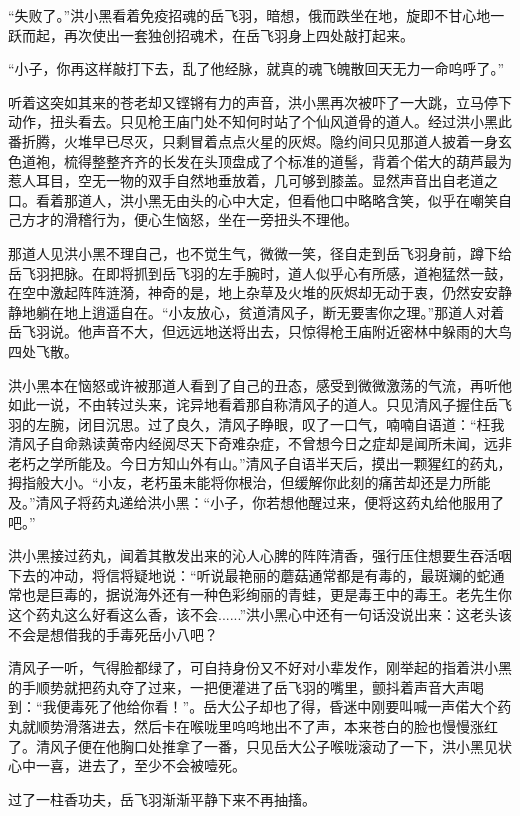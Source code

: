 “失败了。”洪小黑看着免疫招魂的岳飞羽，暗想，俄而跌坐在地，旋即不甘心地一跃而起，再次使出一套独创招魂术，在岳飞羽身上四处敲打起来。

“小子，你再这样敲打下去，乱了他经脉，就真的魂飞魄散回天无力一命呜呼了。”

听着这突如其来的苍老却又铿锵有力的声音，洪小黑再次被吓了一大跳，立马停下动作，扭头看去。只见枪王庙门处不知何时站了个仙风道骨的道人。经过洪小黑此番折腾，火堆早已尽灭，只剩冒着点点火星的灰烬。隐约间只见那道人披着一身玄色道袍，梳得整整齐齐的长发在头顶盘成了个标准的道髻，背着个偌大的葫芦最为惹人耳目，空无一物的双手自然地垂放着，几可够到膝盖。显然声音出自老道之口。看着那道人，洪小黑无由头的心中大定，但看他口中略略含笑，似乎在嘲笑自己方才的滑稽行为，便心生恼怒，坐在一旁扭头不理他。

那道人见洪小黑不理自己，也不觉生气，微微一笑，径自走到岳飞羽身前，蹲下给岳飞羽把脉。在即将抓到岳飞羽的左手腕时，道人似乎心有所感，道袍猛然一鼓，在空中激起阵阵涟漪，神奇的是，地上杂草及火堆的灰烬却无动于衷，仍然安安静静地躺在地上逍遥自在。“小友放心，贫道清风子，断无要害你之理。”那道人对着岳飞羽说。他声音不大，但远远地送将出去，只惊得枪王庙附近密林中躲雨的大鸟四处飞散。

洪小黑本在恼怒或许被那道人看到了自己的丑态，感受到微微激荡的气流，再听他如此一说，不由转过头来，诧异地看着那自称清风子的道人。只见清风子握住岳飞羽的左腕，闭目沉思。过了良久，清风子睁眼，叹了一口气，喃喃自语道：“枉我清风子自命熟读黄帝内经阅尽天下奇难杂症，不曾想今日之症却是闻所未闻，远非老朽之学所能及。今日方知山外有山。”清风子自语半天后，摸出一颗猩红的药丸，拇指般大小。“小友，老朽虽未能将你根治，但缓解你此刻的痛苦却还是力所能及。”清风子将药丸递给洪小黑：“小子，你若想他醒过来，便将这药丸给他服用了吧。”

洪小黑接过药丸，闻着其散发出来的沁人心脾的阵阵清香，强行压住想要生吞活咽下去的冲动，将信将疑地说：“听说最艳丽的蘑菇通常都是有毒的，最斑斓的蛇通常也是巨毒的，据说海外还有一种色彩绚丽的青蛙，更是毒王中的毒王。老先生你这个药丸这么好看这么香，该不会......”洪小黑心中还有一句话没说出来：这老头该不会是想借我的手毒死岳小八吧？

清风子一听，气得脸都绿了，可自持身份又不好对小辈发作，刚举起的指着洪小黑的手顺势就把药丸夺了过来，一把便灌进了岳飞羽的嘴里，颤抖着声音大声喝到：“我便毒死了他给你看！”。岳大公子却也了得，昏迷中刚要叫喊一声偌大个药丸就顺势滑落进去，然后卡在喉咙里呜呜地出不了声，本来苍白的脸也慢慢涨红了。清风子便在他胸口处推拿了一番，只见岳大公子喉咙滚动了一下，洪小黑见状心中一喜，进去了，至少不会被噎死。

过了一柱香功夫，岳飞羽渐渐平静下来不再抽搐。

